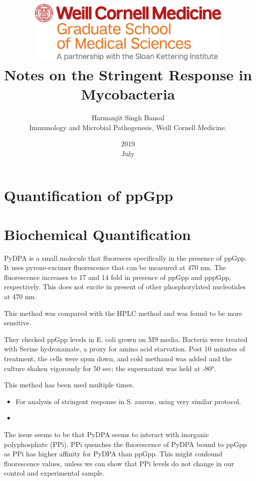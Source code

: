 \documentclass[12pt, oneside]{book}
\title{\includegraphics[width=10cm]{logo.png}\\[6cm] Notes on the Stringent Response in Mycobacteria\\[1cm]}
\date{2019 \\ July}
\author{Harmanjit Singh Bansal \\[1cm] Immunology and Microbial Pathogenesis, Weill Cornell Medicine.}
\begin{document}
\frontmatter
	\maketitle

\section{Quantification of ppGpp}

\section{Biochemical Quantification}

PyDPA is a small molecule that fluoresces specifically in the presence of ppGpp.
It uses pyrene-excimer fluorescence that can be measured at 470 nm. 
The fluorescence increases to 17 and 14 fold in presence of ppGpp and pppGpp, respectively.
This does not excite in present of other phosphorylated nucleotides at 470 nm.

This method was compared with the HPLC method and was found to be more sensitive. 

They checked ppGpp levels in E. coli grown on M9 media. Bacteria were treated with Serine hydroxamate, a proxy for amino acid starvation. 
Post 10 minutes of treatment, the cells were spun down, and cold methanol was added and the culture shaken vigorously for 50 sec; the supernatant was held at -80$^o$.

This method has been used multiple times. 

\begin{itemize}
    \item For analysis of stringent response in S. aureus, using very similar protocol.
    \item
\end{itemize}

The issue seems to be that PyDPA seems to interact with inorganic polyphosphate (PPi).
PPi quenches the fluorescence of PyDPA bound to ppGpp as PPi has higher affinity for PyDPA than ppGpp.
This might confound fluorescence values, unless we can show that PPi levels do not change in our control and experimental sample. \cite{gao_2010} 
%         
%         
\end{document}
